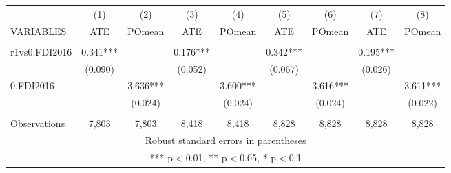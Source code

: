 \documentclass[]{article}
\begin{document}
\begin{tabular}{lcccccccc} \hline
 & (1) & (2) & (3) & (4) & (5) & (6) & (7) & (8) \\
VARIABLES & ATE & POmean & ATE & POmean & ATE & POmean & ATE & POmean \\ \hline
 &  &  &  &  &  &  &  &  \\
r1vs0.FDI2016 & 0.341*** &  & 0.176*** &  & 0.342*** &  & 0.195*** &  \\
 & (0.090) &  & (0.052) &  & (0.067) &  & (0.026) &  \\
0.FDI2016 &  & 3.636*** &  & 3.600*** &  & 3.616*** &  & 3.611*** \\
 &  & (0.024) &  & (0.024) &  & (0.024) &  & (0.022) \\
 &  &  &  &  &  &  &  &  \\
 Observations & 7,803 & 7,803 & 8,418 & 8,418 & 8,828 & 8,828 & 8,828 & 8,828 \\ \hline
\multicolumn{9}{c}{ Robust standard errors in parentheses} \\
\multicolumn{9}{c}{ *** p$<$0.01, ** p$<$0.05, * p$<$0.1} \\
\end{tabular}
\end{document}
